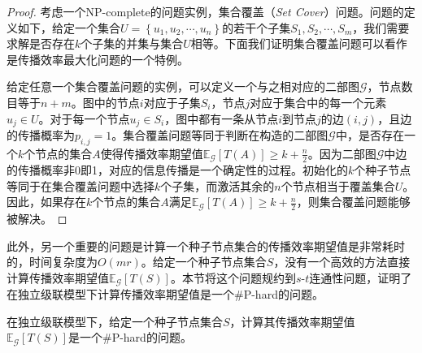 \begin{proof}\label{pro:npHard}
考虑一个NP-complete的问题实例，集合覆盖（\textit{Set Cover}）问题。问题的定义如下，给定一个集合$U=\left\{u_1, u_2, \cdots, u_n\right\}$的若干个子集$S_1, S_2, \cdots, S_m$，我们需要求解是否存在$k$个子集的并集与集合$U$相等。下面我们证明集合覆盖问题可以看作是传播效率最大化问题的一个特例。

给定任意一个集合覆盖问题的实例，可以定义一个与之相对应的二部图$\mathcal{G}$，节点数目等于$n+m$。图中的节点$i$对应于子集$S_i$，节点$j$对应于集合中的每一个元素$u_j \in U$。对于每一个节点$u_j \in S_i$，图中都有一条从节点$i$到节点$j$的边$\left(i,j\right)$，且边的传播概率为$p_{i,j}=1$。集合覆盖问题等同于判断在构造的二部图$\mathcal{G}$中，是否存在一个$k$个节点的集合$A$使得传播效率期望值$\mathbb{E}_\mathcal{G}\left[T\left(A\right)\right] \geq k+\frac{n}{2}$。因为二部图$\mathcal{G}$中边的传播概率非0即1，对应的信息传播是一个确定性的过程。初始化的$k$个种子节点等同于在集合覆盖问题中选择$k$个子集，而激活其余的$n$个节点相当于覆盖集合$U$。因此，如果存在$k$个节点的集合$A$满足$\mathbb{E}_\mathcal{G}\left[T\left(A\right)\right] \geq k+\frac{n}{2}$，则集合覆盖问题能够被解决。
\end{proof}

此外，另一个重要的问题是计算一个种子节点集合的传播效率期望值是非常耗时的，时间复杂度为$O\left(mr\right)$。给定一个种子节点集合$S$，没有一个高效的方法直接计算传播效率期望值$\mathbb{E}_\mathcal{G}\left[T\left(S\right)\right]$。本节将这个问题规约到$s$-$t$连通性问题，证明了在独立级联模型下计算传播效率期望值是一个\#P-hard的问题。

\begin{mytheo}
\label{theo:sharpHard}
在独立级联模型下，给定一个种子节点集合$S$，计算其传播效率期望值$\mathbb{E}_\mathcal{G}\left[T\left(S\right)\right]$是一个\#P-hard的问题。
\end{mytheo}

